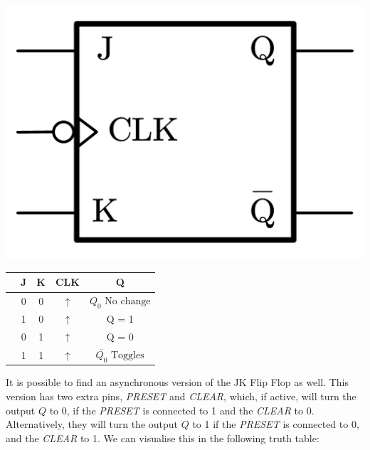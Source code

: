 \documentclass[a4paper, 11pt, oneside]{article}
\begin{document}
\begin{minipage}{\textwidth}
    \begin{minipage}[b]{0.49\textwidth}
        \centering
        \includegraphics[scale=0.25]{Graphics/Practice 2/GRAPHICS/LOGIC GATES/JK SYNCH.pdf}
        \label{fig:JK_Synch}
    \end{minipage}
    \hfill
    \begin{minipage}[b]{0.49\textwidth}
        \centering
            \begin{tabular}[t]{lcccc}
                \toprule
                &\textbf{J}&\textbf{K}&\textbf{CLK}&\textbf{Q}\\
                \midrule
                &0&0& $\uparrow$ & $Q_0 \text{ No change}$\\
                &1&0& $\uparrow$ & Q = 1\\
                &0&1& $\uparrow$ & Q = 0\\
                &1&1& $\uparrow$ & $\overline{Q_0} \text{ Toggles}$\\
                \bottomrule
            \end{tabular}
        \label{table:JK_Synch_TT}
    \end{minipage}
\end{minipage}

\vspace{0.5cm}

It is possible to find an asynchronous version of the JK Flip Flop as well. This version has two extra pins, \textit{PRESET} and \textit{CLEAR}, which, if active, will turn the output $Q$ to 0, if the \textit{PRESET} is connected to 1 and the \textit{CLEAR} to 0. Alternatively, they will turn the output $Q$ to 1 if the \textit{PRESET} is connected to 0, and the \textit{CLEAR} to 1. We can visualise this in the following truth table: 
\end{document}
